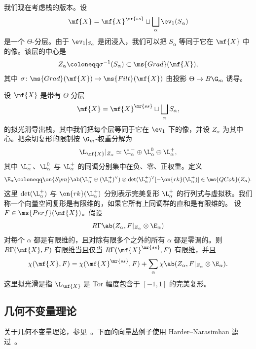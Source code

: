 我们现在考虑栈的版本。设
\[
    \mf{X}
    =
    \mf{X}^{\mr{ss}}
    \sqcup
    \bigsqcup_\alpha\ev_1(S_\alpha)
\]
是一个 \(\Theta\)-分层。由于 \(\ev_1|_{S_\alpha}\) 是闭浸入，我们可以把 \(S_\alpha\) 等同于它在 \(\mf{X}\) 中的像。该层的中心是
\[
    Z_\alpha\coloneqq\sigma^{-1}(S_\alpha)\subset\ms{Grad}(\mf{X}),
\]
其中 \(\sigma\colon\ms{Grad}(\mf{X})\to\ms{Filt}(\mf{X})\) 由投影 \(\Theta\to B\G_m\) 诱导。

\begin{thm}
    设 \(\mf{X}\) 是带有 \(\Theta\)-分层
    \[
        \mf{X}
        =
        \mf{X}^{\mr{ss}}
        \sqcup
        \bigsqcup_\alpha S_\alpha,
    \]
    的拟光滑导出栈，其中我们把每个层等同于它在 \(\ev_1\) 下的像，并设 \(Z_\alpha\) 为其中心。把余切复形的限制按 \(\G_m\)-权重分解为
    \[
        \L_{\mf{X}}|_{Z_\alpha}
        \simeq
        \L_\alpha^-
        \oplus
        \L_\alpha^0
        \oplus
        \L_\alpha^+,
    \]
    其中 \(\L_\alpha^-\)、\(\L_\alpha^0\) 与 \(\L_\alpha^+\) 的同调分别集中在负、零、正权重。定义
    \[
        \E_\alpha
        \coloneqq
        \on{Sym}\ab(
            \L_\alpha^-
            \oplus
            (\L_\alpha^+)^\vee
        )
        \otimes
        \det(\L_\alpha^+)^\vee
        [-\on{rk}(\L_\alpha^+)]
        \in
        \ms{QCoh}(Z_\alpha).
    \]
    这里 \(\det(\L_\alpha^+)\) 与 \(\on{rk}(\L_\alpha^+)\) 分别表示完美复形 \(\L_\alpha^+\) 的行列式与虚拟秩。我们称一个向量空间复形是有限维的，如果它所有上同调群的直和是有限维的。
    设 \(F\in\ms{Perf}(\mf{X})\)。假设
    \[
        R\Gamma\ab(
            Z_\alpha,
            F|_{Z_\alpha}\otimes\E_\alpha
        )
    \]
    对每个 \(\alpha\) 都是有限维的，且对除有限多个之外的所有 \(\alpha\) 都是零调的。则 \(R\Gamma(\mf{X},F)\) 有限维当且仅当 \(R\Gamma(\mf{X}^{\mr{ss}},F)\) 有限维，并且
    \[
        \chi(\mf{X},F)
        =
        \chi(\mf{X}^{\mr{ss}},F)
        +
        \sum_\alpha
        \chi\ab(
            Z_\alpha,
            F|_{Z_\alpha}\otimes\E_\alpha
        ).
    \]
    这里拟光滑是指 \(\L_{\mf{X}}\) 是 Tor 幅度包含于 \([-1,1]\) 的完美复形。
\end{thm}


\subsection{几何不变量理论}%
\label{sub:Geometric invariant theory}

关于几何不变量理论，参见~\cite{MFK1994}。下面的向量丛例子使用 Harder--Narasimhan 滤过~\cite{HN1975}。

